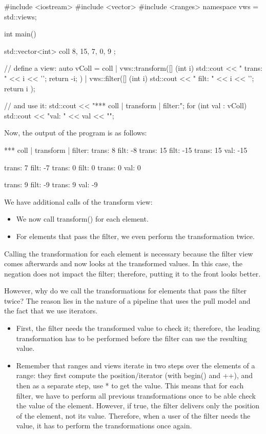 \begin{cpp}
#include <iostream>
#include <vector>
#include <ranges>
namespace vws = std::views;

int main()
{
	std::vector<int> coll{ 8, 15, 7, 0, 9 };
	
	// define a view:
	auto vColl = coll
	| vws::transform([] (int i) {
		std::cout << " trans: " << i << '\n';
		return -i;
	})
	| vws::filter([] (int i) {
		std::cout << " filt: " << i << '\n';
		return i %
	});
	
	// and use it:
	std::cout << "*** coll | transform | filter:\n";
	for (int val : vColl) {
	std::cout << "val: " << val << "\n\n";
	}
}
\end{cpp}

Now, the output of the program is as follows:

\begin{shell}
*** coll | transform | filter:
trans: 8
filt: -8
trans: 15
filt: -15
trans: 15
val: -15

trans: 7
filt: -7
trans: 0
filt: 0
trans: 0
val: 0

trans: 9
filt: -9
trans: 9
val: -9
\end{shell}

We have additional calls of the transform view:

\begin{itemize}
\item
We now call transform() for each element.

\item
For elements that pass the filter, we even perform the transformation twice.
\end{itemize}

Calling the transformation for each element is necessary because the filter view comes afterwards and now looks at the transformed values. In this case, the negation does not impact the filter; therefore, putting it to the front looks better.

However, why do we call the transformations for elements that pass the filter twice? The reason lies in the nature of a pipeline that uses the pull model and the fact that we use iterators.

\begin{itemize}
\item
First, the filter needs the transformed value to check it; therefore, the leading transformation has to be performed before the filter can use the resulting value.
	
\item
Remember that ranges and views iterate in two steps over the elements of a range: they first compute the position/iterator (with begin() and ++), and then as a separate step, use * to get the value. This means that for each filter, we have to perform all previous transformations once to be able check the value of the element. However, if true, the filter delivers only the position of the element, not its value. Therefore, when a user of the filter needs the value, it has to perform the transformations once again.
\end{itemize}

